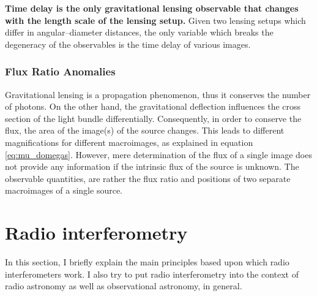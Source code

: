 \documentclass[a4wide,12pt]{book}
\begin{document}
{{\bf Time delay is the only gravitational lensing observable that changes with the length scale of the lensing setup.} Given two lensing setups which differ in angular--diameter distances, the only variable which breaks the degeneracy of the observables is the time delay of various images.
 
\subsection{Flux Ratio Anomalies}
\label{subsec:Flux Ratio Anomalies}
Gravitational lensing is a propagation phenomenon, thus it conserves the number of photons. On the other hand, the gravitational deflection influences the cross section of the light bundle differentially. Consequently, in order to conserve the flux, the area of the image(s) of the source changes. This leads to different magnifications for different macroimages, as explained in equation \ref{eq:mu_domegas}. However, mere determination of the flux of a single image does not provide any information if the intrinsic flux of the source is unknown. The observable quantities, are rather the flux ratio and positions of two separate macroimages of a single source.

\chapter{Radio interferometry}
In this section, I briefly explain the main principles based upon which radio interferometers work. I also try to put radio interferometry into the context of radio astronomy as well as observational astronomy, in general.

}
\end{document}
